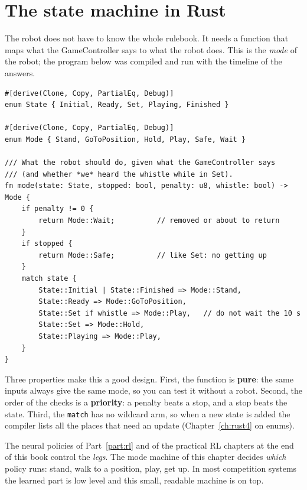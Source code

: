 \section*{The state machine in Rust}
The robot does not have to know the whole rulebook. It needs a function that maps what the GameController says to what the robot does. This is the \emph{mode} of the robot; the program below was compiled and run with the timeline of the answers.

\begin{verbatim}
#[derive(Clone, Copy, PartialEq, Debug)]
enum State { Initial, Ready, Set, Playing, Finished }

#[derive(Clone, Copy, PartialEq, Debug)]
enum Mode { Stand, GoToPosition, Hold, Play, Safe, Wait }

/// What the robot should do, given what the GameController says
/// (and whether *we* heard the whistle while in Set).
fn mode(state: State, stopped: bool, penalty: u8, whistle: bool) -> Mode {
    if penalty != 0 {
        return Mode::Wait;          // removed or about to return
    }
    if stopped {
        return Mode::Safe;          // like Set: no getting up
    }
    match state {
        State::Initial | State::Finished => Mode::Stand,
        State::Ready => Mode::GoToPosition,
        State::Set if whistle => Mode::Play,   // do not wait the 10 s
        State::Set => Mode::Hold,
        State::Playing => Mode::Play,
    }
}
\end{verbatim}

Three properties make this a good design. First, the function is \textbf{pure}: the same inputs always give the same mode, so you can test it without a robot. Second, the order of the checks is a \textbf{priority}: a penalty beats a stop, and a stop beats the state. Third, the \verb!match! has no wildcard arm, so when a new state is added the compiler lists all the places that need an update (Chapter~\ref{ch:rust4} on enums).

\begin{aibox}
The neural policies of Part~\ref{part:rl} and of the practical RL chapters at the end of this book control the \emph{legs}. The mode machine of this chapter decides \emph{which} policy runs: stand, walk to a position, play, get up. In most competition systems the learned part is low level and this small, readable machine is on top.
\end{aibox}

